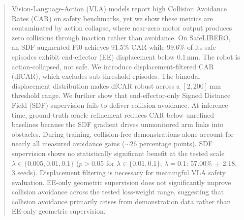 \begin{abstract}
Vision-Language-Action (VLA) models report high Collision Avoidance Rates (CAR) on safety benchmarks, yet we show these metrics are contaminated by action collapse, where near-zero motor output produces zero collisions through inaction rather than avoidance.
On SafeLIBERO, an SDF-augmented Pi0 achieves 91.5\% CAR while 99.6\% of its safe episodes exhibit end-effector (EE) displacement below 0.1\,mm. The robot is action-collapsed, not safe.
We introduce displacement-filtered CAR (dfCAR), which excludes sub-threshold episodes. The bimodal displacement distribution makes dfCAR robust across a $[2, 200]$\,mm threshold range.
We further show that end-effector-only Signed Distance Field (SDF) supervision fails to deliver collision avoidance. At inference time, ground-truth oracle refinement reduces CAR below unrefined baselines because the SDF gradient drives unmonitored arm links into obstacles. During training, collision-free demonstrations alone account for nearly all measured avoidance gains (${\sim}$26 percentage points). SDF supervision shows no statistically significant benefit at the tested scale $\lambda \in \{0.005, 0.01, 0.1\}$ ($p > 0.05$ for $\lambda \in \{0.01, 0.1\}$; $\lambda = 0.1$: 57.00\%$\,\pm\,$2.18, 3 seeds).
Displacement filtering is necessary for meaningful VLA safety evaluation. EE-only geometric supervision does not significantly improve collision avoidance across the tested loss-weight range, suggesting that collision avoidance primarily arises from demonstration data rather than EE-only geometric supervision.
\end{abstract}
